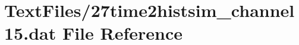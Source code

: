 \hypertarget{27time2histsim__channel15_8dat}{}\section{Text\+Files/27time2histsim\+\_\+channel15.dat File Reference}
\label{27time2histsim__channel15_8dat}
